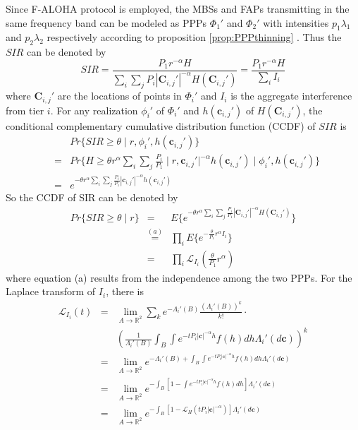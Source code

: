\documentclass[a4paper,twocolumn]{IEEEtran}
\begin{document}
Since F-ALOHA protocol is employed, the MBSs and FAPs transmitting in the same frequency band can be modeled as PPPs $\Phi_1'$ and $\Phi_2'$ with intensities $p_1\lambda_1$ and $p_2\lambda_2$ respectively according to proposition \ref{prop:PPPthinning} . Thus the $SIR$ can be denoted by
\begin{equation}
SIR = \frac{P_1 r^{-\alpha} H}{\sum_i\sum_j P_i | \bm{C}_{i,j}' |^{-\alpha} H(\bm{C}_{i,j}')}=\frac{P_1 r^{-\alpha} H}{\sum_i I_i}
\end{equation}
where $\bm{C}_{i,j}'$ are the locations of points in $\Phi_i'$ and  $I_i$ is the aggregate interference from tier $i$. For any realization $\phi_i'$ of $\Phi_i'$ and $h(\bm{c}_{i,j}')$ of $H(\bm{C}_{i,j}')$, the conditional complementary cumulative distribution function (CCDF) of $SIR$ is
\begin{eqnarray}
&&Pr\{SIR \geq \theta \mid r, \phi_i',h(\bm{c}_{i,j}') \}\nonumber\\
&=& Pr \{ H \geq \theta r^{\alpha} {\sum_i\sum_j \frac{P_i}{P_1} \mid r, \bm{c}_{i,j}' |^{-\alpha} h(\bm{c}_{i,j}')} \mid \phi_i',h(\bm{c}_{i,j}') \} \nonumber\\
&=& e^{-\theta r^{\alpha} {\sum_i\sum_j \frac{P_i}{P_1} | \bm{c}_{i,j}' |^{-\alpha} h(\bm{c}_{i,j}')}}
\end{eqnarray}
So the CCDF of SIR can be denoted by
\begin{eqnarray}
Pr\{SIR \geq \theta \mid r\}&=&E\{ e^{-\theta r^{\alpha} {\sum_i\sum_j \frac{P_i}{P_1} | \bm{C}_{i,j}' |^{-\alpha} H(\bm{C}_{i,j}')}} \} \nonumber\\
&\stackrel{(a)}{=}&\prod_{i} E \{ e^{- \frac{\theta}{P_1} r^{\alpha} I_i} \} \nonumber\\
&=&\prod_{i} \mathcal{L}_{I_i} (\frac{\theta}{P_1} r^{\alpha})
\end{eqnarray}
where equation (a) results from the independence among the two PPPs. For the Laplace transform of $I_i$, there is
\begin{eqnarray}\label{Eq:Lap_Intf}
\mathcal{L}_{I_i} (t) &=&\lim_{A \rightarrow \mathbb{R}^2} \sum_k e^{-\Lambda_i' (B)} \frac{(\Lambda_i' (B))^k}{k!}\cdot \nonumber\\
&&(\frac{1}{\Lambda_i' (B)}\int_{B}\int e^{-t P_i |\bm{c}|^{-\alpha} h}f(h) dh \Lambda_i'(d\bm{c}))^k \nonumber\\
&=&\lim_{A \rightarrow \mathbb{R}^2} e^{-\Lambda_i' (B)+\int_{B}\int e^{-t P_i |\bm{c}|^{-\alpha} h}f(h) dh \Lambda_i'(d\bm{c})}\nonumber\\
&=&\lim_{A \rightarrow \mathbb{R}^2}  e^{-\int_{B}[1-\int e^{-t P_i |\bm{c}|^{-\alpha} h}f(h) dh] \Lambda_i'(d\bm{c})}\nonumber\\
&=&\lim_{A \rightarrow \mathbb{R}^2}  e^{-\int_{B}[1-\mathcal{L}_H (t P_i |\bm{c}|^{-\alpha})] \Lambda_i'(d\bm{c})}
\end{eqnarray}
\end{document}
